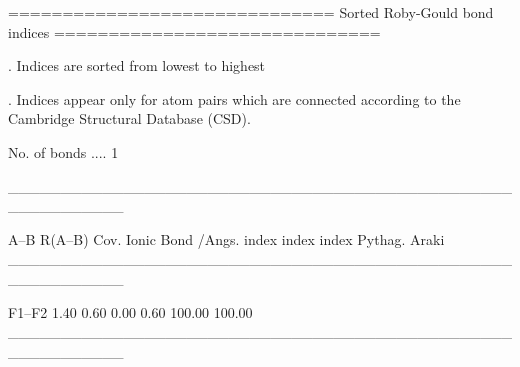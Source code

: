 
==============================
Sorted Roby-Gould bond indices
==============================

. Indices are sorted from lowest to highest

. Indices appear only for atom pairs which are connected
  according to the Cambridge Structural Database (CSD).

No. of bonds .... 1

___________________________________________________________

   A--B     R(A--B)    Cov.   Ionic   Bond    %
             /Angs.   index   index  index  Pythag.   Araki
___________________________________________________________

  F1--F2       1.40    0.60    0.00   0.60   100.00  100.00
___________________________________________________________
